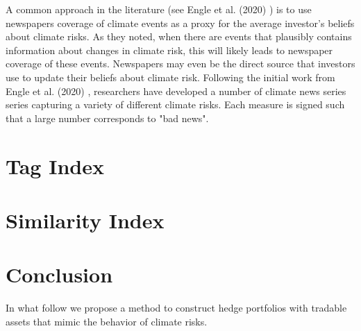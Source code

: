 A common approach in the literature (see Engle et al. (2020) \cite{engle2020hedging})
is to use newspapers coverage of climate events as a proxy 
for the average investor's beliefs about climate risks.
As they noted, when there are events that plausibly
contains information about changes in climate risk,
this will likely leads to newspaper coverage of these events.
Newspapers may even be the direct source that investors
use to update their beliefs about climate risk.
Following the initial work from Engle et al. (2020) \cite{engle2020hedging},
researchers have developed a number of climate 
news series series capturing a variety of different climate risks.
Each measure is signed such that a large number 
corresponds to "bad news".




\section{Tag Index}


\section{Similarity Index}

\section{Conclusion}

In what follow we propose a method to construct
hedge portfolios with tradable assets that
mimic the behavior of climate risks. 
